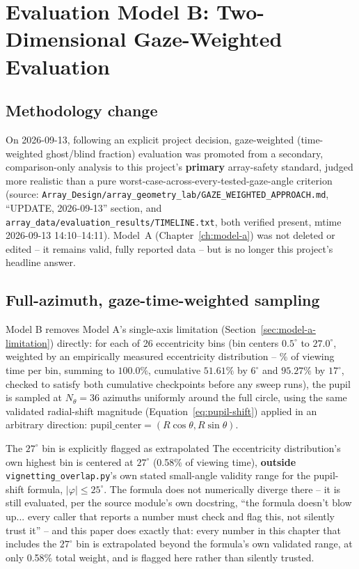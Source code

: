 \chapter{Evaluation Model B: Two-Dimensional Gaze-Weighted Evaluation}
\label{ch:model-b}

\section{Methodology change}
On 2026-09-13, following an explicit project decision, gaze-weighted (time-weighted
ghost/blind fraction) evaluation was promoted from a secondary, comparison-only
analysis to this project's \textbf{primary} array-safety standard, judged more
realistic than a pure worst-case-across-every-tested-gaze-angle criterion (source:
\texttt{Array\_Design/array\_geometry\_lab/GAZE\_WEIGHTED\_APPROACH.md}, ``UPDATE,
2026-09-13'' section, and
\texttt{array\_data/evaluation\_results/TIMELINE.txt}, both verified present, mtime
2026-09-13 14:10--14:11). Model~A (Chapter~\ref{ch:model-a}) was not deleted or edited
-- it remains valid, fully reported data -- but is no longer this project's headline
answer.

\section{Full-azimuth, gaze-time-weighted sampling}
\label{sec:model-b-method}
Model B removes Model A's single-axis limitation (Section~\ref{sec:model-a-limitation})
directly: for each of 26 eccentricity bins (bin centers $0.5^\circ$ to $27.0^\circ$,
weighted by an empirically measured eccentricity distribution -- \%
of viewing time per bin, summing to $100.0\%$, cumulative $51.61\%$ by $6^\circ$ and
$95.27\%$ by $17^\circ$, checked to satisfy both cumulative checkpoints before any sweep
runs), the pupil is sampled at $N_\theta=36$ azimuths uniformly around the full circle,
using the same validated radial-shift magnitude (Equation~\ref{eq:pupil-shift}) applied
in an arbitrary direction: $\mathrm{pupil\_center}=(R\cos\theta,R\sin\theta)$.

\begin{keybox}{The $27^\circ$ bin is explicitly flagged as extrapolated}
The eccentricity distribution's own highest bin is centered at $27^\circ$ (0.58\% of
viewing time), \textbf{outside} \texttt{vignetting\_overlap.py}'s own stated small-angle
validity range for the pupil-shift formula, $|\varphi|\le25^\circ$. The formula does not
numerically diverge there -- it is still evaluated, per the source module's own
docstring, ``the formula doesn't blow up... every caller that reports a number must
check and flag this, not silently trust it'' -- and this paper does exactly that: every
number in this chapter that includes the $27^\circ$ bin is extrapolated beyond the
formula's own validated range, at only 0.58\% total weight, and is flagged here rather
than silently trusted.
\end{keybox}

